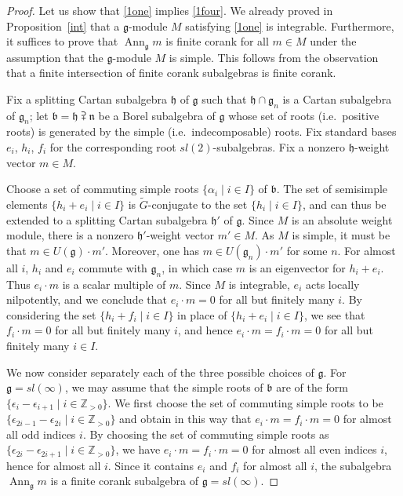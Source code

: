 \documentclass{amsart}
\renewcommand{\sl}{sl}
\renewcommand{\gg}{\mathfrak{g}}
\newcommand{\hh}{\mathfrak{h}}
\newcommand{\bb}{\mathfrak{b}}
\newcommand{\nn}{\mathfrak{n}}
\newcommand{\ZZ}{\mathbb{Z}}
\newcommand{\Ann}{\operatorname{Ann}}
\theoremstyle{definition}
\numberwithin{equation}{section}
\begin{document}
\begin{proof}
Let us show that \eqref{1one} implies \eqref{1four}.  We already proved in Proposition~\ref{int} that a $\gg$-module $M$ satisfying \eqref{1one} is integrable.  Furthermore, it suffices to prove that $\Ann_\gg m$ is finite corank for all $m\in M$ under the assumption that the $\gg$-module $M$ is simple.  This follows from the observation that a finite intersection of finite corank subalgebras is finite corank. 

Fix a splitting Cartan subalgebra $\hh$ of $\gg$ such that $\hh \cap \gg_n$ is a Cartan subalgebra of $\gg_n$; let $\bb = \hh \supsetplus \nn$ be a Borel subalgebra of $\gg$ whose set of roots (i.e.\ positive roots) is generated by the simple (i.e.\ indecomposable) roots.  Fix standard bases $e_i$, $h_i$, $f_i$ for the corresponding root $\sl(2)$-subalgebras.  Fix a nonzero $\hh$-weight vector $m \in M$.  

Choose a set of commuting simple roots $\{ \alpha_i \mid i \in I \}$ of $\bb$.
The set of semisimple elements $\{ h_i + e_i \mid i \in I \}$ is $\tilde G$-conjugate to the set $\{ h_i \mid i \in I \}$, and can thus be extended to a splitting Cartan subalgebra $\hh'$ of $\gg$.  Since $M$ is an absolute weight module, there is a nonzero $\hh'$-weight vector $m' \in M$.  As $M$ is simple, it must be that $m \in U(\gg) \cdot m'$.  Moreover, one has $m \in U(\gg_n) \cdot m'$ for some $n$.  For almost all $i$, $h_i$ and $e_i$ commute with $\gg_n$, in which case $m$ is an eigenvector for $h_i + e_i$.  Thus $e_i \cdot m$ is a scalar multiple of $m$.  Since $M$ is integrable, $e_i$ acts locally nilpotently, and we conclude that $e_i \cdot m = 0$ for all but finitely many $i$.  By considering the set $\{ h_i + f_i \mid i \in I \}$ in place of $\{ h_i + e_i \mid i \in I \}$, we see that $f_i \cdot m = 0$ for all but finitely many $i$, and hence $e_i \cdot m = f_i \cdot m = 0$ for all but finitely many $i \in I$.  

We now consider separately each of the three possible choices of $\gg$.  For $\gg = \sl(\infty)$, we may assume that the simple roots of $\bb$ are of the form $\{ \epsilon_i - \epsilon_{i+1} \mid i \in \ZZ_{>0} \}$.  
We first choose the set of commuting simple roots to be $\{\epsilon_{2i-1} - \epsilon_{2i} \mid i \in \ZZ_{>0} \}$ 
and obtain in this way that $e_i \cdot  m = f_i \cdot m = 0$ for almost all odd indices $i$.  By choosing the set of 
commuting simple roots as $\{\epsilon_{2i} - \epsilon_{2i+1} \mid i
\in \ZZ_{>0} \}$, we have $e_i \cdot  m = f_i \cdot m =  0$ for almost 
all even indices $i$, hence for almost all $i$.  Since it contains
$e_i$ and $f_i$ for almost all $i$, the subalgebra
$\Ann_\gg m$ is a finite corank subalgebra of $\gg = \sl(\infty)$.  


\end{proof}
\end{document}
